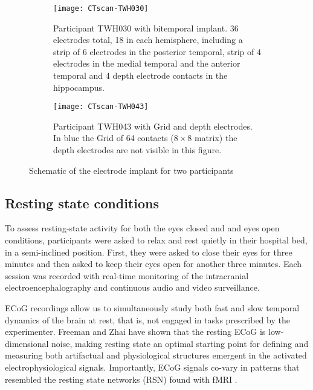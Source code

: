 \documentclass[11pt, onecolumn]{article}
\begin{document}
\begin{figure}[ht] 
  \begin{subfigure}[t]{0.5\linewidth}
    \centering
    \texttt{[image: CTscan-TWH030]} 
    \caption{Participant TWH030 with bitemporal implant. 36 electrodes total, 18 in each hemisphere, including a strip of 6 electrodes in the posterior temporal, strip of 4 electrodes in the medial temporal and the anterior temporal and 4 depth electrode contacts in the hippocampus.} 
    \label{fig0:a} 
    \vspace{4ex}
  \end{subfigure}%
  \hspace{1ex}
  \begin{subfigure}[t]{0.5\linewidth}
    \centering
    \texttt{[image: CTscan-TWH043]} 
    \caption{Participant TWH043 with Grid and depth electrodes. In blue the Grid of 64 contacts ($8 \times 8$ matrix) the depth electrodes are not visible in this figure.} 
    \label{fig0:b} 
    \vspace{4ex}
  \end{subfigure} 
  \caption{Schematic of the electrode implant for two participants}
  \label{fig0} 
\end{figure}

\subsection{Resting state conditions}
To assess resting-state activity for both the eyes closed and and eyes open conditions, participants were asked to relax and rest quietly in their hospital bed, in a semi-inclined position. First, they were asked to close their eyes for three minutes and then asked to keep their eyes open for another three minutes. Each session was recorded with real-time monitoring of the intracranial electroencephalography and continuous audio and video surveillance.

ECoG recordings allow us to simultaneously study both fast and slow temporal dynamics of the brain at rest, that is, not engaged in tasks prescribed by the experimenter.
Freeman and Zhai \citep{freeman2009simulated} have shown that the resting ECoG is low-dimensional noise, making resting state an optimal starting point for defining and measuring both artifactual and physiological structures emergent in the activated electrophysiological signals. Importantly, ECoG signals co-vary in patterns that resembled the resting state networks (RSN) found with fMRI  \citep{fukushima2015studying}.
\end{document}
